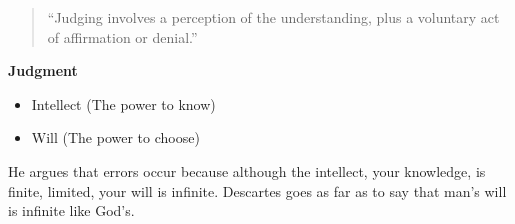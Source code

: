 \documentclass{article}
\begin{document}
\begin{spacing}{1.2}
    \begin{quotation}
        ``Judging involves a perception of the understanding, plus a voluntary act of affirmation or denial.''
    \end{quotation}

    \textbf{Judgment}
    \begin{itemize}
        \item Intellect (The power to know)
        \item Will (The power to choose)
    \end{itemize}
    
    He argues that errors occur because although the intellect, your knowledge, is finite, limited, your will is infinite. Descartes goes as far as to say that man's will is infinite like God's.

    \end{spacing}
    
\end{document}
